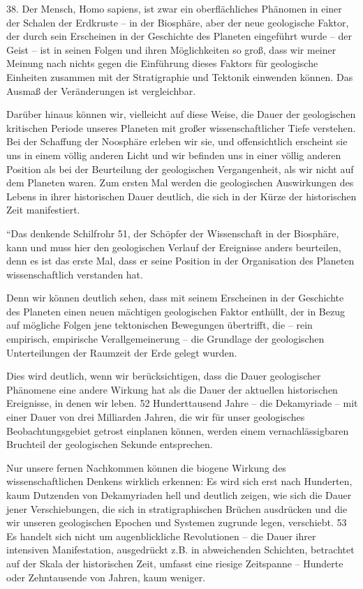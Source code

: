 \documentclass[11pt,a4paper]{book}
\begin{document}
38. Der Mensch, Homo sapiens, ist zwar ein oberflächliches Phänomen in einer der Schalen der Erdkruste -- in der Biosphäre, aber der neue geologische Faktor, der durch sein Erscheinen in der Geschichte des Planeten eingeführt wurde -- der Geist -- ist in seinen Folgen und ihren Möglichkeiten so groß, dass wir meiner Meinung nach nichts gegen die Einführung dieses Faktors für geologische Einheiten zusammen mit der Stratigraphie und Tektonik einwenden können. Das Ausmaß der Veränderungen ist vergleichbar. 

Darüber hinaus können wir, vielleicht auf diese Weise, die Dauer der geologischen kritischen Periode unseres Planeten mit großer wissenschaftlicher Tiefe verstehen. Bei der Schaffung der Noosphäre erleben wir sie, und offensichtlich erscheint sie uns in einem völlig anderen Licht und wir befinden uns in einer völlig anderen Position als bei der Beurteilung der geologischen Vergangenheit, als wir nicht auf dem Planeten waren. Zum ersten Mal werden die geologischen Auswirkungen des Lebens in ihrer historischen Dauer deutlich, die sich in der Kürze der historischen Zeit manifestiert. 

“Das denkende Schilfrohr 51, der Schöpfer der Wissenschaft in der Biosphäre, kann und muss hier den geologischen Verlauf der Ereignisse anders beurteilen, denn es ist das erste Mal, dass er seine Position in der Organisation des Planeten wissenschaftlich verstanden hat. 

Denn wir können deutlich sehen, dass mit seinem Erscheinen in der Geschichte des Planeten einen neuen mächtigen geologischen Faktor enthüllt, der in Bezug auf mögliche Folgen jene tektonischen Bewegungen übertrifft, die -- rein empirisch, empirische Verallgemeinerung -- die Grundlage der geologischen Unterteilungen der Raumzeit der Erde gelegt wurden. 

Dies wird deutlich, wenn wir berücksichtigen, dass die Dauer geologischer Phänomene eine andere Wirkung hat als die Dauer der aktuellen historischen Ereignisse, in denen wir leben. 52 Hunderttausend Jahre -- die Dekamyriade -- mit einer Dauer von drei Milliarden Jahren, die wir für unser geologisches Beobachtungsgebiet getrost einplanen können, werden einem vernachlässigbaren Bruchteil der geologischen Sekunde entsprechen. 

Nur unsere fernen Nachkommen können die biogene Wirkung des wissenschaftlichen Denkens wirklich erkennen: Es wird sich erst nach Hunderten, kaum Dutzenden von Dekamyriaden hell und deutlich zeigen, wie sich die Dauer jener Verschiebungen, die sich in stratigraphischen Brüchen ausdrücken und die wir unseren geologischen Epochen und Systemen zugrunde legen, verschiebt. 53 Es handelt sich nicht um augenblickliche Revolutionen -- die Dauer ihrer intensiven Manifestation, ausgedrückt z.B. in abweichenden Schichten, betrachtet auf der Skala der historischen Zeit, umfasst eine riesige Zeitspanne -- Hunderte oder Zehntausende von Jahren, kaum weniger. 
\end{document}

